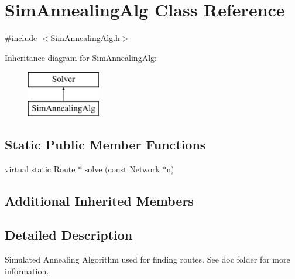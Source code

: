 \hypertarget{classSimAnnealingAlg}{\section{Sim\+Annealing\+Alg Class Reference}
\label{classSimAnnealingAlg}
}


{\ttfamily \#include $<$Sim\+Annealing\+Alg.\+h$>$}

Inheritance diagram for Sim\+Annealing\+Alg\+:\begin{figure}[H]
\begin{center}
\leavevmode
\includegraphics[height=2.000000cm]{classSimAnnealingAlg}
\end{center}
\end{figure}
\subsection*{Static Public Member Functions}
\begin{DoxyCompactItemize}
\item 
virtual static \hyperlink{classRoute}{Route} $\ast$ \hyperlink{classSimAnnealingAlg_adc4279f093215c222928f5a0a2b9c4f0}{solve} (const \hyperlink{classNetwork}{Network} $\ast$n)
\end{DoxyCompactItemize}
\subsection*{Additional Inherited Members}


\subsection{Detailed Description}
Simulated Annealing Algorithm used for finding routes. See doc folder for more information. 

